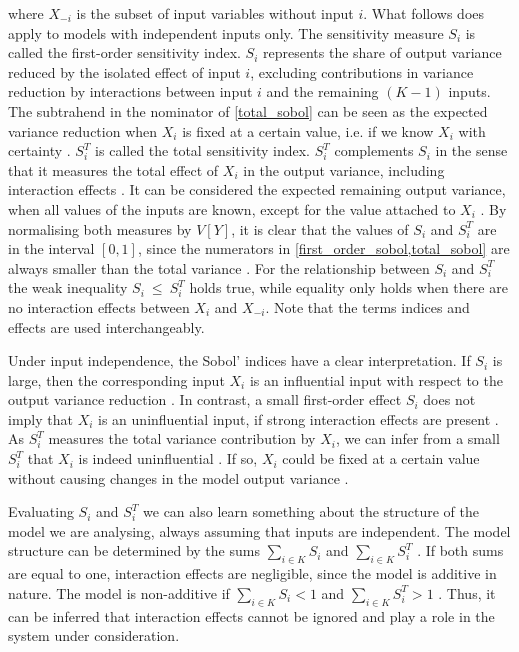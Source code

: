 \noindent where $X_{- i}$ is the subset of input variables without input $i$. What follows does apply to models with independent inputs only. The sensitivity measure $S_i$ is called the first-order sensitivity index. $S_i$ represents the share of output variance reduced by the isolated effect of input $i$, excluding contributions in variance reduction by interactions between input $i$ and the remaining $(K-1)$ inputs. The subtrahend in the nominator of \cref{total_sobol} can be seen as the expected variance reduction when $X_i$ is fixed at a certain value, i.e. if we know $X_i$ with certainty \citep{SNS16}. $S_i^T$ is called the total sensitivity index. $S_i^T$ complements $S_i$ in the sense that it measures the total effect of $X_i$ in the output variance, including interaction effects \citep{SNS16}. It can be considered the expected remaining output variance, when all values of the inputs are known, except for the value attached to $X_i$ \citep{SNS16}. By normalising both measures by $V[Y]$, it is clear that the values of $S_i$ and $S_i^T$ are in the interval $[0, 1]$, since the numerators in \cref{first_order_sobol,total_sobol} are always smaller than the total variance \citep{GM17}. For the relationship between $S_i$ and $S_i^T$ the weak inequality $S_i\ \le\ S_i^T$ holds true, while equality only holds when there are no interaction effects between $X_i$ and $X_{- i}$. Note that the terms indices and effects are used interchangeably.

Under input independence, the Sobol' indices have a clear interpretation. If $S_i$ is large, then the corresponding input $X_i$ is an influential input with respect to the output variance reduction \citep{GM17}. In contrast, a small first-order effect $S_i$ does not imply that $X_i$ is an uninfluential input, if strong interaction effects are present \citep{GM17}. As $S_i^T$ measures the total variance contribution by $X_i$, we can infer from a small $S_i^T$ that $X_i$ is indeed uninfluential \citep{GM17}. If so, $X_i$ could be fixed at a certain value without causing changes in the model output variance \citep{GM17}.

Evaluating $S_i$ and $S_i^T$ we can also learn something about the structure of the model we are analysing, always assuming that inputs are independent. The model structure can be determined by the sums $\sum_{i \in K} S_i$ and $\sum_{i \in K} S_i^T$ \citep{GM17}. If both sums are equal to one, interaction effects are negligible, since the model is additive in nature. The model is non-additive if $\sum_{i \in K} S_i < 1$ and $\sum_{i \in K} S_i^T > 1$ \citep{GM17}. Thus, it can be inferred that interaction effects cannot be ignored and play a role in the system under consideration.

